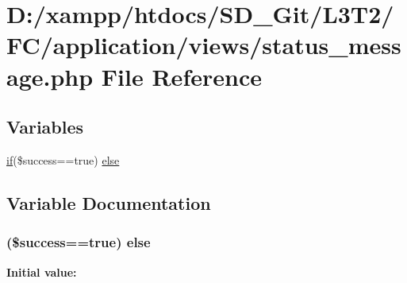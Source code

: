 \hypertarget{application_2views_2status__message_8php}{}\section{D\+:/xampp/htdocs/\+S\+D\+\_\+\+Git/\+L3\+T2/\+F\+C/application/views/status\+\_\+message.php File Reference}
\label{application_2views_2status__message_8php}
\subsection*{Variables}
\begin{DoxyCompactItemize}
\item 
\hyperlink{_admin_2assets_2js_2bootstrap_8min_8js_a87cf461060832b8b68a7b48d9e371e4f}{if}(\$success==true) \hyperlink{application_2views_2status__message_8php_a84f1479bab3bfbc24c532aabdaff1053}{else}
\end{DoxyCompactItemize}


\subsection{Variable Documentation}
\hypertarget{application_2views_2status__message_8php_a84f1479bab3bfbc24c532aabdaff1053}{}
\subsubsection[{else}]{ (\$success==true) else}\label{application_2views_2status__message_8php_a84f1479bab3bfbc24c532aabdaff1053}
{\bfseries Initial value\+:}
